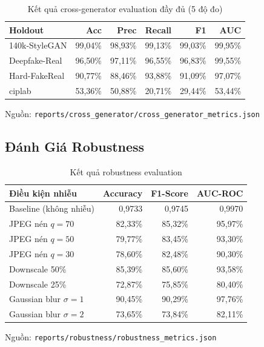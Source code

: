 \begin{table}[H]
  \centering
  \caption{Kết quả cross-generator evaluation đầy đủ (5 độ đo)}
  \label{tab:cross_gen}
  \begin{tabular}{lrrrrr}
    \toprule
    \textbf{Holdout} & \textbf{Acc} & \textbf{Prec} & \textbf{Recall} & \textbf{F1} & \textbf{AUC} \\
    \midrule
    140k-StyleGAN & 99,04\% & 98,93\% & 99,13\% & 99,03\% & 99,95\% \\
    Deepfake-Real & 96,50\% & 97,11\% & 96,55\% & 96,83\% & 99,55\% \\
    Hard-FakeReal & 90,77\% & 88,46\% & 93,88\% & 91,09\% & 97,07\% \\
    ciplab        & 53,36\% & 50,88\% & 20,71\% & 29,44\% & 53,44\% \\
    \bottomrule
  \end{tabular}
  \newline
  {\small Nguồn: \texttt{reports/cross\_generator/cross\_generator\_metrics.json}}
\end{table}

\subsection{Đánh Giá Robustness}

\begin{table}[H]
  \centering
  \caption{Kết quả robustness evaluation}
  \label{tab:robustness}
  \begin{tabular}{lrrr}
    \toprule
    \textbf{Điều kiện nhiễu} & \textbf{Accuracy} & \textbf{F1-Score} & \textbf{AUC-ROC} \\
    \midrule
    Baseline (không nhiễu) & 0,9733 & 0,9745 & 0,9970 \\
    JPEG nén $q=70$        & 82,33\% & 85,32\% & 95,97\% \\
    JPEG nén $q=50$        & 79,77\% & 83,45\% & 93,30\% \\
    JPEG nén $q=30$        & 78,60\% & 82,48\% & 90,30\% \\
    Downscale 50\%         & 85,39\% & 85,60\% & 93,58\% \\
    Downscale 25\%         & 72,87\% & 75,85\% & 80,40\% \\
    Gaussian blur $\sigma=1$ & 90,45\% & 90,29\% & 97,76\% \\
    Gaussian blur $\sigma=2$ & 73,65\% & 73,84\% & 82,11\% \\
    \bottomrule
  \end{tabular}
  \newline
  {\small Nguồn: \texttt{reports/robustness/robustness\_metrics.json}}
\end{table}

